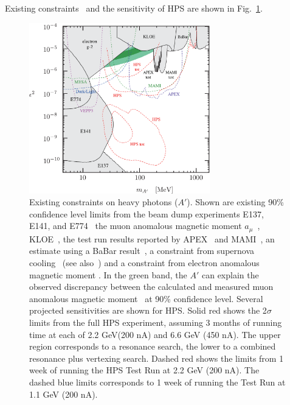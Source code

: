 Existing constraints~\cite{endo:g2e} and the sensitivity of HPS are 
shown in Fig.~\ref{fig:hspaw-heavy-A'}. 

\begin{figure}[h]
\centering
\includegraphics[width=0.7\textwidth]{limit_g-2_electron.pdf} 
\caption{
Existing constraints on heavy photons ($A'$). 
Shown are existing 90\% confidence level limits from the beam dump experiments 
E137, E141, and E774~\cite{Bjorken:2009mm,Bjorken:1988as,Riordan:1987aw,Bross:1989mp} 
the muon anomalous magnetic moment $a_\mu$~\cite{Pospelov:2008zw},  
KLOE~\cite{Collaboration:2011zc}, 
the test run results reported by APEX~\cite{Abrahamyan:2011gv} and MAMI~\cite{Merkel:2011ze}, 
an estimate using a BaBar result~\cite{Bjorken:2009mm,Reece:2009un,Aubert:2009cp},
a constraint from supernova cooling~\cite{Bjorken:2009mm} (see also~\cite{Dent:2012mx}) and a constraint from electron anomalous magnetic moment \cite{endo:g2e}.
In the green band, the $A'$ can explain the observed discrepancy between the
calculated and measured muon anomalous magnetic moment~\cite{Pospelov:2008zw} 
at 90\% confidence level.
Several projected sensitivities are shown for HPS. Solid red shows the 2$\sigma$ limits from the full HPS experiment, assuming 3 months of running time at each of 2.2 GeV(200 nA) and 6.6 GeV (450 nA). The upper region corresponds to a resonance search, the lower to a combined resonance plus vertexing search. Dashed red shows the limits from 1 week of running the HPS Test Run at 2.2 GeV (200 nA). The dashed blue limits corresponds to 1 week of running the Test Run at 1.1 GeV (200 nA).  
}
\label{fig:hspaw-heavy-A'}
\end{figure}


